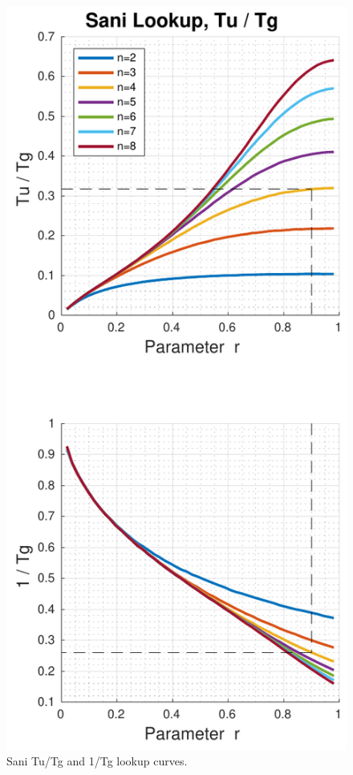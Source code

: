 \begin{figure}
    \includegraphics[width=\linewidth]{images/sani_curves_tu_tg}
    \caption{Sani Tu/Tg and 1/Tg lookup curves.}
    \label{fig:sani_tu_tg}
\end{figure}
